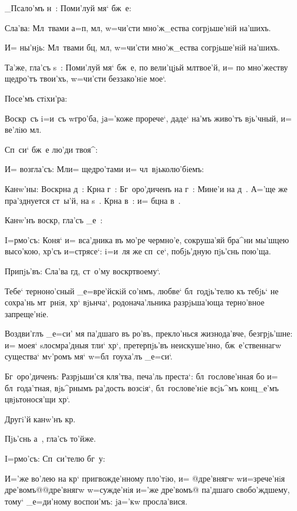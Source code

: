 _Псало'мъ н~: Поми'луй мя` бж~е:

Сла'ва: Мл~твами а=п, мл, w=чи'сти 
мно'ж_ества согрjьше'нiй на'шихъ. 

И= ны'нjь: Мл~твами бц, мл, w=чи'сти 
мно'ж_ества согрjьше'нiй на'шихъ.

Та'же, гла'съ s~: Поми'луй мя` бж~е, по вели'цjьй 
мл твое'й, и= по мно'жеству щедро'тъ твои'хъ, 
w=чи'сти беззако'нiе мое`.

Посе'мъ стiхи'ра: 

Воскр~съ i=и~съ w\т гро'ба, jа='коже прорече`, даде` 
на'мъ живо'тъ вjь'чный, и= ве'лiю мл. 

Сп~си` бж~е лю'ди твоя^:

И= возгла'съ: Мл и= щедро'тами и= 
чл~вjьколю'бiемъ: 

Канw'ны: Воскр на д~: Кр на г~: 
Бг~оро'диченъ на г~: Мине'и на д~. А='ще же пра'зднуется 
ст~ы'й, на s~. Кр на в~: и= бц на в~.

Канw'нъ воскр, гла'съ _е~:


I=рмо'съ: Коня` и= вса'дника въ мо'ре чермно'е, 
сокруша'яй бра^ни мы'шцею высо'кою, хр'съ и=стрясе`: 
i=и~ля же сп~се`, побjь'дную пjь'снь пою'ща.

Припjь'въ: Сла'ва гд, ст~о'му воскр твоему`. 

Тебе` терноно'сный _е=вре'йскiй со'нмъ, любве` 
бл~годjь'телю къ тебjь` не сохра'нь мт~рнiя, хр` 
вjьнча`, родонача'льника разрjьша'юща терно'вное 
запреще'нiе.

Воздви'глъ _е=си' мя па'дшаго въ ро'въ, прекло'нься 
жизнода'вче, безгрjь'шне: и= моея` sлосмра'дныя тли` 
хр`, претерпjь'въ неискуше'нно, бж~е'ственнагw 
существа` мv'ромъ мя` w=бл~гоуха'лъ _е=си`.

Бг~оро'диченъ: Разрjьши'ся кля'тва, печа'ль преста`: 
бл~гослове'нная бо и= бл~года'тная, вjь^рнымъ ра'дость 
возсiя`, бл~гослове'нiе всjь^мъ конц_е'мъ цвjьтонося'щи 
хр`.

Другi'й канw'нъ кр. 

Пjь'снь а~, гла'съ то'йже.

I=рмо'съ: Сп~си'телю бг~у:

И='же во'лею на кр` пригвожде'нному пло'тiю, и= 
@дре'внягw w\т и=зрече'нiя дре'вомъ@{@дре'внягw 
w=сужде'нiя и='же дре'вомъ@} па'дшаго свобо'ждшему, тому` 
_е=ди'ному воспои'мъ: jа='кw просла'вися.

